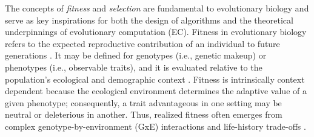The concepts of \textit{fitness} and \textit{selection} are fundamental to evolutionary biology and serve as key inspirations for both the design of algorithms and the theoretical underpinnings of evolutionary computation (EC).
Fitness in evolutionary biology refers to the expected reproductive contribution of an individual to future generations \citep{orr2009fitness}.
It may be defined for genotypes (i.e., genetic makeup) or phenotypes (i.e., observable traits), and it is evaluated relative to the population's ecological and demographic context \citep{orr2009fitness}.
Fitness is intrinsically context dependent because the ecological environment determines the adaptive value of a given phenotype; consequently, a trait advantageous in one setting may be neutral or deleterious in another.
Thus, realized fitness often emerges from complex genotype-by-environment (GxE) interactions and life-history trade-offs \citep{falconer1983quantitative}.

